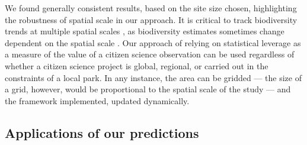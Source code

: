 \documentclass[9pt,twocolumn,twoside,lineno]{pnas-new}
\begin{document}
We found generally consistent results, based on the site size chosen, highlighting the robustness of spatial scale in our approach. It is critical to track biodiversity trends at multiple spatial scales \cite{soberon2007assessing}, as biodiversity estimates sometimes change dependent on the spatial scale \cite{chase2013scale}. Our approach of relying on statistical leverage as a measure of the value of a citizen science observation can be used regardless of whether a citizen science project is global, regional, or carried out in the constraints of a local park. In any instance, the area can be gridded --- the size of a grid, however, would be proportional to the spatial scale of the study --- and the framework implemented, updated dynamically.

\subsection*{Applications of our predictions}
\end{document}
